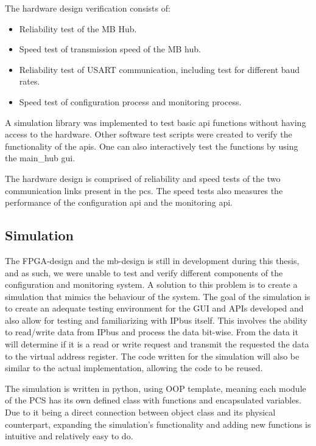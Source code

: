 \documentclass[main.tex]{subfiles}
\begin{document}
The hardware design verification consists of:

\begin{itemize}
    \item Reliability test of the MB Hub.
    \item Speed test of transmission speed of the MB hub.
    \item Reliability test of USART communication, including test for different baud rates.
    \item Speed test of configuration process and monitoring process.
\end{itemize}

A simulation library was implemented to test basic \gls{api} functions without having access to the hardware. Other software test scripts were created to verify the functionality of the \gls{api}s. One can also interactively test the functions by using the main\_hub \gls{gui}. 

The hardware design is comprised of reliability and speed tests of the two communication links present in the \gls{pcs}. The speed tests also measures the performance of the configuration \gls{api} and the monitoring \gls{api}.


\subsection{Simulation}

The FPGA-design and the \gls{mb}-design is still in development during this thesis, and as such, we were unable to test and verify different components of the configuration and monitoring system. A solution to this problem is to create a simulation that mimics the behaviour of the system. The goal of the simulation is to create an adequate testing environment for the GUI and APIs developed and also allow for testing and familiarizing with IPbus itself. This involves the ability to read/write data from IPbus and process the data bit-wise. From the data it will determine if it is a read or write request and transmit the requested the data to the virtual address register. The code written for the simulation will also be similar to the actual implementation, allowing the code to be reused.

The simulation is written in python, using OOP template, meaning each module of the PCS has its own defined class with functions and encapsulated variables. Due to it being a direct connection between object class and its physical counterpart, expanding the simulation's functionality and adding new functions is intuitive and relatively easy to do.
\end{document}
